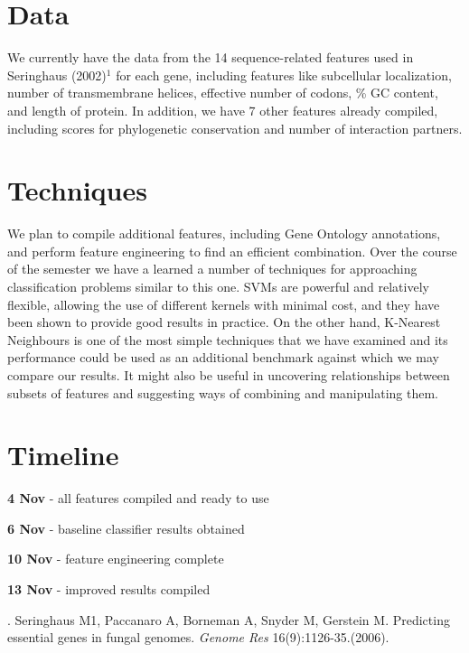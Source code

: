 \documentclass{article}
\begin{document}
\section{Data} \label{Data}

We currently have the data from the 14 sequence-related features used in Seringhaus (2002)$^1$ for each gene, including features like subcellular localization, number of transmembrane helices, effective number of codons, \% GC content, and length of protein. In addition, we have 7 other features already compiled, including scores for phylogenetic conservation and number of interaction partners. 


\section{Techniques}
We plan to compile additional features, including Gene Ontology annotations, and perform feature engineering to find an efficient combination. Over the course of the semester we have a learned a number of techniques for approaching classification problems similar to this one. SVMs are powerful and relatively flexible, allowing the use of different kernels with minimal cost, and they have been shown to provide good results in practice. On the other hand, K-Nearest Neighbours is one of the most simple techniques that we have examined and its performance could be used as an additional benchmark against which we may compare our results. It might also be useful in uncovering relationships between subsets of features and suggesting ways of combining and manipulating them.


\section{Timeline}
\begin{multicols}{2}

\noindent
\textbf{4 Nov} - all features compiled and ready to use

\noindent
\textbf{6 Nov} - baseline classifier results obtained

\noindent
\textbf{10 Nov} - feature engineering complete

\noindent
\textbf{13 Nov} - improved results compiled
\end{multicols}

. Seringhaus M1, Paccanaro A, Borneman A, Snyder M, Gerstein M. Predicting essential genes in fungal genomes. \textit{Genome Res} 16(9):1126-35.(2006).
\end{document}
